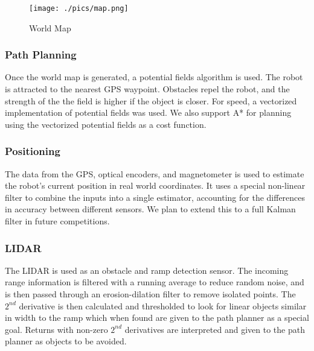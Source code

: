 \begin{figure}[H]
\begin{center}
\texttt{[image: ./pics/map.png]}
\caption{World Map}
\label{FIG:Map}
\end{center}
\end{figure}

\subsubsection{Path Planning}

Once the world map is generated, a potential fields algorithm is used. The robot is attracted to the nearest GPS waypoint. Obstacles repel the robot, and the strength of the the field is higher if the object is closer. For speed, a vectorized implementation of potential fields was used. We also support A* for planning using the vectorized potential fields as a cost function. 

\subsubsection{Positioning}

The data from the GPS, optical encoders, and magnetometer is used to estimate the robot's current position in real world coordinates. It uses a special non-linear filter to combine the inputs into a single estimator, accounting for the differences in accuracy between different sensors. We plan to extend this to a full Kalman filter in future competitions.

\subsubsection{LIDAR}

The LIDAR is used as an obstacle and ramp detection sensor. The incoming range information is filtered with a running average to reduce random noise, and is then passed through an erosion-dilation filter to remove isolated points. The $2^{nd}$ derivative is then calculated and thresholded to look for linear objects similar in width to the ramp which when found are given to the path planner as a special goal. Returns with non-zero $2^{nd}$ derivatives are interpreted and given to the path planner as objects to be avoided.
